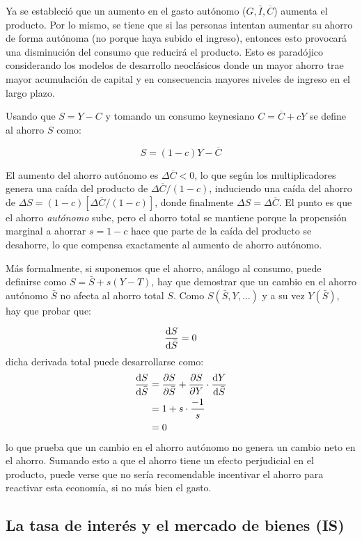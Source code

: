 \documentclass[DeGregorioResumen]{subfiles}
\begin{document}
Ya se estableció que un aumento en el gasto autónomo ($G, \bar I, \overline C$) aumenta el producto. Por lo mismo, se tiene que si las personas intentan aumentar su ahorro de forma autónoma (no porque haya subido el ingreso), entonces esto provocará una disminución del consumo que reducirá el producto. Esto es paradójico considerando los modelos de desarrollo neoclásicos donde un mayor ahorro trae mayor acumulación de capital y en consecuencia mayores niveles de ingreso en el largo plazo.

Usando que $S=Y-C$ y tomando un consumo keynesiano $C=\overline{C}+cY$ se define al ahorro $S$ como:

\begin{equation*}
S = (1-c)Y-\overline{C}
\end{equation*}

El aumento del ahorro autónomo es $\Delta \overline{C}<0$, lo que según los multiplicadores genera una caída del producto de $\Delta \overline{C} /(1-c) $, induciendo una caída del ahorro de $\Delta S = (1-c)[\Delta \overline{C}/(1-c)] $, donde finalmente $\Delta S = \Delta \overline{C}$. El punto es que el ahorro \emph{autónomo} sube, pero el ahorro total se mantiene porque la propensión marginal a ahorrar $s=1-c$ hace que parte de la caída del producto se desahorre, lo que compensa exactamente al aumento de ahorro autónomo.

Más formalmente, si suponemos que el ahorro, análogo al consumo, puede definirse como $S=\bar{S}+s(Y-T)$, hay que demostrar que un cambio en el ahorro autónomo $\bar{S}$ no afecta al ahorro total $S$. Como $S(\bar{S},Y,...)$ y a su vez $Y(\bar{S})$, hay que probar que:

\begin{equation*}
\frac{\mathop{}\!\mathrm{d} S}{\mathop{}\!\mathrm{d} \bar{S}}=0
\end{equation*}
dicha derivada total puede desarrollarse como:
\begin{align*}
\frac{\mathop{}\!\mathrm{d} S}{\mathop{}\!\mathrm{d} \bar{S}} &= \frac{\partial S}{\partial\bar{S}}+\frac{\partial S}{\partial Y}\cdot \frac{\mathop{}\!\mathrm{d} Y}{\mathop{}\!\mathrm{d} \bar{S}} \\
&= 1+s\cdot \frac{-1}{s} \\
&= 0
\end{align*}
lo que prueba que un cambio en el ahorro autónomo no genera un cambio neto en el ahorro. Sumando esto a que el ahorro tiene un efecto perjudicial en el producto, puede verse que no sería recomendable incentivar el ahorro para reactivar esta economía, si no más bien el gasto.

\subsection{La tasa de interés y el mercado de bienes (IS)}
\end{document}
